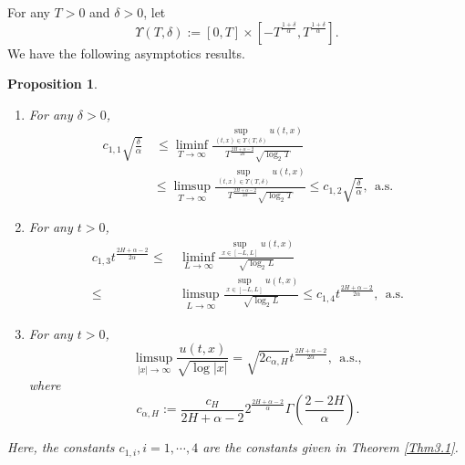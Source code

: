 \documentclass[11pt,reqno]{amsart}
\numberwithin{equation}{section}
\newtheorem{proposition}[theorem]{Proposition}
\newcommand{\1}{{\bf 1}}
\newcommand{\2}{{\bf 2}}
\begin{document}
For any $T>0$ and $\delta>0$, let
\begin{equation}\label{eq Up}
    \Upsilon(T,  \delta):= [0,T]\times \left[-T^{\frac{1+\delta}{\alpha}},T^{\frac{1+\delta}{\alpha}}\right].
\end{equation}
We have the following asymptotics results. 
\begin{proposition}\label{cor1}
\begin{enumerate}
\item[(a)]    For any $\delta>0$, 
\begin{equation}\label{Thm3.1-3}
\begin{split}
c_{1,1}\sqrt{\frac{\delta}{\alpha}}&\, \le \liminf_{T\rightarrow\infty}\frac {  \sup_{(t,x)\in\Upsilon(T, \delta)} u(t,x) }    {T^{\frac{2H+\alpha-2}{2\alpha}} \sqrt{\log_2 T}  }\\
& \le  \limsup_{T\rightarrow\infty}\frac {  \sup_{(t,x)\in\Upsilon(T, \delta)} u(t,x) }    {T^{\frac{2H+\alpha-2}{2\alpha}} \sqrt{\log_2 T}  }\le c_{1,2}\sqrt{\frac{\delta}{\alpha}},\ \ \text{a.s.}
\end{split}
\end{equation}
\item[(b)] For any $t>0$,
\begin{equation}\label{cor-1}
\begin{split} 
c_{1,3}t^{\frac{2H+\alpha-2}{2\alpha}}
\leq&\, \liminf_{L\rightarrow\infty}\frac{\sup_{x\in[-L,L]}u(t,x)}{\sqrt{\log_2 L}} \\
\leq&\, \limsup_{L\rightarrow\infty}\frac{\sup_{x\in[-L,L]}u(t,x)}{\sqrt{\log_2 L}}
\leq c_{1,4}t^{\frac{2H+\alpha-2}{2\alpha}},\ \ \text{a.s.}
\end{split}
\end{equation}
\item[(c)]
For any $t>0$,
\begin{equation}\label{u/log}
\limsup_{|x|\rightarrow\infty}\frac{u(t,x)}{\sqrt{\log |x|}} =\sqrt{2c_{\alpha, H }}t^{\frac{2H+\alpha-2}{2\alpha}},\ \ \text{a.s.},
\end{equation}
where 
\begin{equation}\label{eq c a H}
c_{\alpha, H} :=\frac{c_{H}} {2H+\alpha-2}  2^{ \frac{2H+\alpha-2}{\alpha}}\Gamma\left(\frac{2-2H}{\alpha}\right).
\end{equation}
\end{enumerate}
Here, the constants $c_{1,i}, i=1, \cdots, 4$ are the constants given in   Theorem \ref{Thm3.1}.
\end{proposition}
\end{document}
